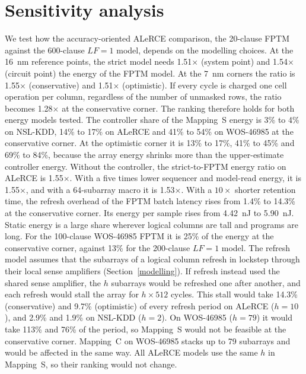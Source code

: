 \documentclass[preprint,12pt]{elsarticle}
\newcommand{\hyp}[1]{#1}
\newcommand{\LF}{\mathit{LF}}
\begin{document}
\section{Sensitivity analysis}\label{sens}
We test how the accuracy-oriented ALeRCE comparison, the 20-clause FPTM against the 600-clause $\LF=1$ model, depends on the modelling choices.
At the 16~nm reference points, the strict model needs \hyp{1.51$\times$} (system point) and \hyp{1.54$\times$} (circuit point) the energy of the FPTM model.
At the 7~nm corners the ratio is \hyp{1.55$\times$} (conservative) and \hyp{1.51$\times$} (optimistic).
If every cycle is charged one cell operation per column, regardless of the number of unmasked rows, the ratio becomes \hyp{1.28$\times$} at the conservative corner.
The ranking therefore holds for both energy models tested.
The controller share of the Mapping~S energy is \hyp{3\% to 4\%} on NSL-KDD, \hyp{14\% to 17\%} on ALeRCE and \hyp{41\% to 54\%} on WOS-46985 at the conservative corner. At the optimistic corner it is \hyp{13\% to 17\%}, \hyp{41\% to 45\%} and \hyp{69\% to 84\%}, because the array energy shrinks more than the upper-estimate controller energy. Without the controller, the strict-to-FPTM energy ratio on ALeRCE is \hyp{1.55$\times$}. With a five times lower sequencer and model-read energy, it is \hyp{1.55$\times$}, and with a 64-subarray macro it is \hyp{1.53$\times$}.
With a $10\times$ shorter retention time, the refresh overhead of the FPTM batch latency rises from \hyp{1.4\%} to \hyp{14.3\%} at the conservative corner. Its energy per sample rises from \hyp{4.42~nJ} to \hyp{5.90~nJ}.
Static energy is a large share wherever logical columns are tall and programs are long. For the 100-clause WOS-46985 FPTM it is \hyp{25\%} of the energy at the conservative corner, against \hyp{13\%} for the 200-clause $\LF=1$ model.
The refresh model assumes that the subarrays of a logical column refresh in lockstep through their local sense amplifiers (Section~\ref{modelling}). If refresh instead used the shared sense amplifier, the $h$ subarrays would be refreshed one after another, and each refresh would stall the array for $h\times512$ cycles. This stall would take \hyp{14.3\%} (conservative) and \hyp{9.7\%} (optimistic) of every refresh period on ALeRCE ($h=10$), and \hyp{2.9\%} and \hyp{1.9\%} on NSL-KDD ($h=2$). On WOS-46985 ($h=79$) it would take \hyp{113\%} and \hyp{76\%} of the period, so Mapping~S would not be feasible at the conservative corner. Mapping~C on WOS-46985 stacks up to 79 subarrays and would be affected in the same way. All ALeRCE models use the same $h$ in Mapping~S, so their ranking would not change.
\end{document}
